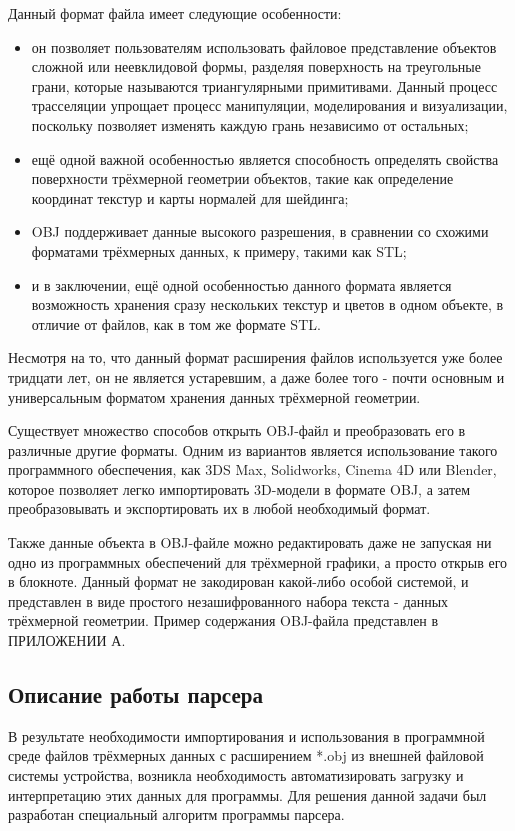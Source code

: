 Данный формат файла имеет следующие особенности:
\begin{itemize}
	\item он позволяет пользователям использовать файловое представление объектов сложной или неевклидовой формы, разделяя поверхность на треугольные грани, которые называются триангулярными примитивами. Данный процесс трасселяции упрощает процесс манипуляции, моделирования и визуализации, поскольку позволяет изменять каждую грань независимо от остальных;
	\item ещё одной важной особенностью является способность определять свойства поверхности трёхмерной геометрии объектов, такие как определение координат текстур и карты нормалей для шейдинга;
	\item OBJ поддерживает данные высокого разрешения, в сравнении со схожими форматами трёхмерных данных, к примеру, такими как STL;
	\item и в заключении, ещё одной особенностью данного формата является возможность хранения сразу нескольких текстур и цветов в одном объекте, в отличие от файлов, как в том же формате STL.
\end{itemize}

Несмотря на то, что данный формат расширения файлов используется уже более тридцати лет, он не является устаревшим, а даже более того - почти основным и универсальным форматом хранения данных трёхмерной геометрии. 

Существует множество способов открыть OBJ-файл и преобразовать его в различные другие форматы. Одним из вариантов является использование такого программного обеспечения, как 3DS Max, Solidworks, Cinema 4D или Blender, которое позволяет легко импортировать 3D-модели в формате OBJ, а затем преобразовывать и экспортировать их в любой необходимый формат.

Также данные объекта в OBJ-файле можно редактировать даже не запуская ни одно из программных обеспечений для трёхмерной графики, а просто открыв его в блокноте. Данный формат не закодирован какой-либо особой системой, и представлен в виде простого незашифрованного набора текста - данных трёхмерной геометрии. Пример содержания OBJ-файла представлен в ПРИЛОЖЕНИИ А.

\subsection{Описание работы парсера}

В результате необходимости импортирования и использования в программной среде файлов трёхмерных данных с расширением *.obj из внешней файловой системы устройства, возникла необходимость автоматизировать загрузку и интерпретацию этих данных для программы. Для решения данной задачи был разработан специальный алгоритм программы парсера.

